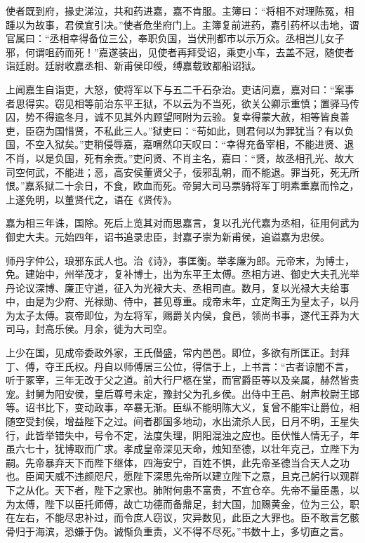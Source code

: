 \documentclass[]{article}
\begin{document}
使者既到府，掾史涕泣，共和药进嘉，嘉不肯服。主簿曰：``将相不对理陈冤，相踵以为故事，君侯宜引决。''使者危坐府门上。主簿复前进药，嘉引药杯以击地，谓官属曰：``丞相幸得备位三公，奉职负国，当伏刑都市以示万众。丞相岂儿女子邪，何谓咀药而死！''嘉遂装出，见使者再拜受诏，乘吏小车，去盖不冠，随使者诣廷尉。廷尉收嘉丞相、新甫侯印绶，缚嘉载致都船诏狱。

上闻嘉生自诣吏，大怒，使将军以下与五二千石杂治。吏诘问嘉，嘉对曰：``案事者思得实。窃见相等前治东平王狱，不以云为不当死，欲关公卿示重慎；置驿马传囚，势不得逾冬月，诚不见其外内顾望阿附为云验。复幸得蒙大赦，相等皆良善吏，臣窃为国惜贤，不私此三人。''狱吏曰：``苟如此，则君何以为罪犹当？有以负国，不空入狱矣。''吏稍侵辱嘉，嘉喟然卬天叹曰：``幸得充备宰相，不能进贤、退不肖，以是负国，死有余责。''吏问贤、不肖主名，嘉曰：``贤，故丞相孔光、故大司空何武，不能进；恶，高安侯董贤父子，佞邪乱朝，而不能退。罪当死，死无所恨。''嘉系狱二十余日，不食，欧血而死。帝舅大司马票骑将军丁明素重嘉而怜之，上遂免明，以董贤代之，语在《贤传》。

嘉为相三年诛，国除。死后上览其对而思嘉言，复以孔光代嘉为丞相，征用何武为御史大夫。元始四年，诏书追录忠臣，封嘉子崇为新甫侯，追谥嘉为忠侯。

师丹字仲公，琅邪东武人也。治《诗》，事匡衡。举孝廉为郎。元帝末，为博士，免。建始中，州举茂才，复补博士，出为东平王太傅。丞相方进、御史大夫孔光举丹论议深博、廉正守道，征入为光禄大夫、丞相司直。数月，复以光禄大夫给事中，由是为少府、光禄勋、侍中，甚见尊重。成帝末年，立定陶王为皇太子，以丹为太子太傅。哀帝即位，为左将军，赐爵关内侯，食邑，领尚书事，遂代王莽为大司马，封高乐侯。月余，徙为大司空。

上少在国，见成帝委政外家，王氏僣盛，常内邑邑。即位，多欲有所匡正。封拜丁、傅，夺王氏权。丹自以师傅居三公位，得信于上，上书言：``古者谅闇不言，听于冢宰，三年无改于父之道。前大行尸柩在堂，而官爵臣等以及亲属，赫然皆贵宠。封舅为阳安侯，皇后尊号未定，豫封父为孔乡侯。出侍中王邑、射声校尉王邯等。诏书比下，变动政事，卒暴无渐。臣纵不能明陈大义，复曾不能牢让爵位，相随空受封侯，增益陛下之过。间者郡国多地动，水出流杀人民，日月不明，王星失行，此皆举错失中，号令不定，法度失理，阴阳混浊之应也。臣伏惟人情无子，年虽六七十，犹博取而广求。孝成皇帝深见天命，烛知至德，以壮年克己，立陛下为嗣。先帝暴弃天下而陛下继体，四海安宁，百姓不惧，此先帝圣德当合天人之功也。臣闻天威不违颜咫尺，愿陛下深思先帝所以建立陛下之意，且克己躬行以观群下之从化。天下者，陛下之家也。肺附何患不富贵，不宜仓卒。先帝不量臣愚，以为太傅，陛下以臣托师傅，故亡功德而备鼎足，封大国，加赐黄金，位为三公，职在左右，不能尽忠补过，而令庶人窃议，灾异数见，此臣之大罪也。臣不敢言乞骸骨归于海滨，恐嫌于伪。诚惭负重责，义不得不尽死。''书数十上，多切直之言。
\end{document}
